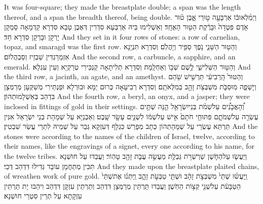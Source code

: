 {It was four-square; they made the breastplate double; a span was the length thereof, and a span the breadth thereof, being double.}{}
{וַיְמַ֨לְאוּ\maqqaf ב֔וֹ אַרְבָּעָ֖ה ט֣וּרֵי אָ֑בֶן ט֗וּר אֹ֤דֶם פִּטְדָה֙ וּבָרֶ֔קֶת הַטּ֖וּר הָאֶחָֽד׃}
{וְאַשְׁלִימוּ בֵּיהּ אַרְבְּעָא סִדְרִין דְּאֶבֶן טָבָא סִדְרָא קַדְמָאָה סָמְקָן יָרְקָן וּבָרְקָן סִדְרָא חַד׃}
{And they set in it four rows of stones: a row of carnelian, topaz, and smaragd was the first row.}{}
{וְהַטּ֖וּר הַשֵּׁנִ֑י נֹ֥פֶךְ סַפִּ֖יר וְיָהֲלֹֽם׃}
{וְסִדְרָא תִּנְיָנָא אִזְמַרַגְדִּין שַׁבְזֵיז וְסַבְהֲלוֹם׃}
{And the second row, a carbuncle, a sapphire, and an emerald.}{}
{וְהַטּ֖וּר הַשְּׁלִישִׁ֑י לֶ֥שֶׁם שְׁב֖וֹ וְאַחְלָֽמָה׃}
{וְסִדְרָא תְּלִיתָאָה קַנְכֵּירִי טְרַקְיָא וְעֵין עִגְלָא׃}
{And the third row, a jacinth, an agate, and an amethyst.}{}
{וְהַטּוּר֙ הָֽרְבִיעִ֔י תַּרְשִׁ֥ישׁ שֹׁ֖הַם וְיָשְׁפֵ֑ה מֽוּסַבֹּ֛ת מִשְׁבְּצֹ֥ת זָהָ֖ב בְּמִלֻּאֹתָֽם׃}
{וְסִדְרָא רְבִיעָאָה כְּרוּם יַמָּא וּבוּרְלָא וּפַנְתֵּירִי מְשַׁקְּעָן מְרַמְּצָן בִּדְהַב בְּאַשְׁלָמוּתְהוֹן׃}
{And the fourth row, a beryl, an onyx, and a jasper; they were inclosed in fittings of gold in their settings.}{}
{וְ֠הָאֲבָנִ֠ים עַל\maqqaf שְׁמֹ֨ת בְּנֵי\maqqaf יִשְׂרָאֵ֥ל הֵ֛נָּה שְׁתֵּ֥ים עֶשְׂרֵ֖ה עַל\maqqaf שְׁמֹתָ֑ם פִּתּוּחֵ֤י חֹתָם֙ אִ֣ישׁ עַל\maqqaf שְׁמ֔וֹ לִשְׁנֵ֥ים עָשָׂ֖ר שָֽׁבֶט׃}
{וְאַבְנַיָּא עַל שְׁמָהָת בְּנֵי יִשְׂרָאֵל אִנִּין תַּרְתַּא עֶשְׂרֵי עַל שְׁמָהָתְהוֹן כְּתָב מְפָרַשׁ כִּגְלָף דְּעִזְקָא גְּבַר עַל שְׁמֵיהּ לִתְרֵי עֲשַׂר שִׁבְטִין׃}
{And the stones were according to the names of the children of Israel, twelve, according to their names, like the engravings of a signet, every one according to his name, for the twelve tribes.}{}
{וַיַּעֲשׂ֧וּ עַל\maqqaf הַחֹ֛שֶׁן שַׁרְשְׁרֹ֥ת גַּבְלֻ֖ת מַעֲשֵׂ֣ה עֲבֹ֑ת זָהָ֖ב טָהֽוֹר׃}
{וַעֲבַדוּ עַל חוּשְׁנָא תִּכִּין מְתַחֲמָן עוֹבָד גְּדִילוּ דִּדְהַב דְּכֵי׃}
{And they made upon the breastplate plaited chains, of wreathen work of pure gold.}{}
{וַֽיַּעֲשׂ֗וּ שְׁתֵּי֙ מִשְׁבְּצֹ֣ת זָהָ֔ב וּשְׁתֵּ֖י טַבְּעֹ֣ת זָהָ֑ב וַֽיִּתְּנ֗וּ אֶת\maqqaf שְׁתֵּי֙ הַטַּבָּעֹ֔ת עַל\maqqaf שְׁנֵ֖י קְצ֥וֹת הַחֹֽשֶׁן׃}
{וַעֲבַדוּ תַּרְתֵּין מְרַמְּצָן דִּדְהַב וְתַרְתֵּין עִזְקָן דִּדְהַב וִיהַבוּ יָת תַּרְתֵּין עִזְקָתָא עַל תְּרֵין סִטְרֵי חוּשְׁנָא׃}
